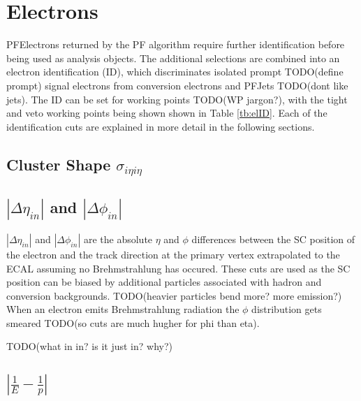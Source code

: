 \section{Electrons}
\label{sec:el}

PFElectrons returned by the PF algorithm require further identification before being used as analysis objects. The additional selections are combined into an electron identification (ID), which discriminates isolated prompt TODO(define prompt) signal electrons from conversion electrons and PFJets TODO(dont like jets). The ID can be set for working points TODO(WP jargon?), with the tight and veto working points being shown shown in Table \ref{tb:elID}. Each of the identification cuts are explained in more detail in the following sections.



\subsection{Cluster Shape $\sigma_{i\eta i\eta}$}
\label{ssec:idss}

\subsection{$|\Delta \eta_{in}|$ and $|\Delta \phi_{in}|$}


$|\Delta \eta_{in}|$ and $|\Delta \phi_{in}|$ are the absolute $\eta$ and $\phi$ differences between the SC position of the electron and the track direction at the primary vertex extrapolated to the ECAL assuming no Brehmstrahlung has occured. These cuts are used as the SC position can be biased by additional particles associated with hadron and conversion backgrounds. TODO(heavier particles bend more? more emission?) When an electron emits Brehmstrahlung radiation the $\phi$ distribution gets smeared TODO(so cuts are much hugher for phi than eta). 

TODO(what in in? is it just in? why?)



\subsection{$|\frac{1}{E}-\frac{1}{p}|$}
\label{ssec:id4}

